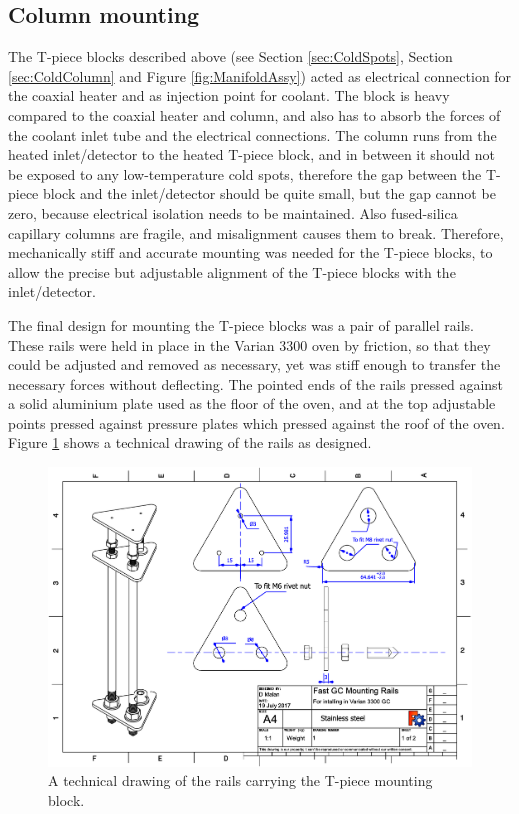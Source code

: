 \subsection{Column mounting}

The T-piece blocks described above (see Section \ref{sec:ColdSpots}, Section
\ref{sec:ColdColumn} and Figure \ref{fig:ManifoldAssy}) acted as electrical
connection for the coaxial heater and as injection point for coolant. The block
is heavy compared to the coaxial heater and column, and also has to absorb the
forces of the coolant inlet tube and the electrical connections. The column runs
from the heated inlet/detector to the heated T-piece block, and in between it
should not be exposed to any low-temperature cold spots, therefore the gap
between the T-piece block and the inlet/detector should be quite small, but the
gap cannot be zero, because electrical isolation needs to be maintained.
Also fused-silica capillary columns are fragile, and misalignment causes them to
break. Therefore, mechanically stiff and accurate mounting was needed for the
T-piece blocks, to allow the precise but adjustable alignment of the T-piece
blocks with the inlet/detector.

The final design for mounting the T-piece blocks was a pair of parallel rails.
These rails were held in place in the Varian 3300 oven by friction, so that they
could be adjusted and removed as necessary, yet was stiff enough to transfer the
necessary forces without deflecting. The pointed ends of the rails pressed
against a solid aluminium plate used as the floor of the oven, and at the top
adjustable points pressed against pressure plates which pressed against the roof
of the oven. Figure \ref{fig:RailsDrawing} shows a technical drawing of the
rails as designed.

\begin{figure}
	\centering
	\includegraphics[angle=90, origin=c, scale=0.75]{Figures/RailsDrawing.pdf}
	\decoRule	
	
	\caption[Technical drawing of coaxial heater mounting
	rails]{\label{fig:RailsDrawing}A technical drawing of the rails carrying the
	T-piece mounting block.}
	
\end{figure}

